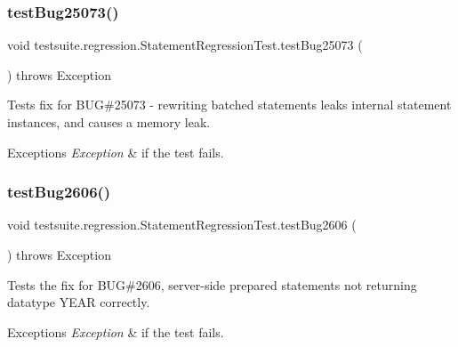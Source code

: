 \subsubsection{\texorpdfstring{test\+Bug25073()}{testBug25073()}}
{\footnotesize\ttfamily void testsuite.\+regression.\+Statement\+Regression\+Test.\+test\+Bug25073 (\begin{DoxyParamCaption}{ }\end{DoxyParamCaption}) throws Exception}

Tests fix for B\+UG\#25073 -\/ rewriting batched statements leaks internal statement instances, and causes a memory leak.


\begin{DoxyExceptions}{Exceptions}
{\em Exception} & if the test fails. \\
\hline
\end{DoxyExceptions}
\mbox{\label{classtestsuite_1_1regression_1_1_statement_regression_test_aa53278612006c285096de5d15c6e17aa}} 
\subsubsection{\texorpdfstring{test\+Bug2606()}{testBug2606()}}
{\footnotesize\ttfamily void testsuite.\+regression.\+Statement\+Regression\+Test.\+test\+Bug2606 (\begin{DoxyParamCaption}{ }\end{DoxyParamCaption}) throws Exception}

Tests the fix for B\+UG\#2606, server-\/side prepared statements not returning datatype Y\+E\+AR correctly.


\begin{DoxyExceptions}{Exceptions}
{\em Exception} & if the test fails. \\
\hline
\end{DoxyExceptions}
\mbox{\label{classtestsuite_1_1regression_1_1_statement_regression_test_a85e39314f65a8b5de7bf5da11ed1fcad}} 
